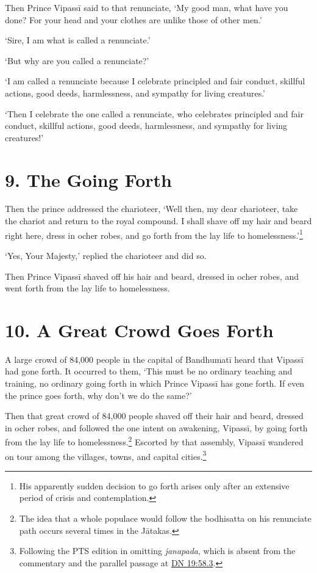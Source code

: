 \documentclass[12pt,openany]{book}%
\begin{document}
Then Prince \textsanskrit{Vipassī} said to that renunciate, ‘My good man, what have you done? For your head and your clothes are unlike those of other men.’ 

‘Sire, I am what is called a renunciate.’ 

‘But why are you called a renunciate?’ 

‘I am called a renunciate because I celebrate principled and fair conduct, skillful actions, good deeds, harmlessness, and sympathy for living creatures.’ 

‘Then I celebrate the one called a renunciate, who celebrates principled and fair conduct, skillful actions, good deeds, harmlessness, and sympathy for living creatures!’ 

\section*{9. The Going Forth }

Then the prince addressed the charioteer, ‘Well then, my dear charioteer, take the chariot and return to the royal compound. I shall shave off my hair and beard right here, dress in ocher robes, and go forth from the lay life to homelessness.’\footnote{His apparently sudden decision to go forth arises only after an extensive period of crisis and contemplation. } 

‘Yes, Your Majesty,’ replied the charioteer and did so. 

Then Prince \textsanskrit{Vipassī} shaved off his hair and beard, dressed in ocher robes, and went forth from the lay life to homelessness. 

\section*{10. A Great Crowd Goes Forth }

A large crowd of 84,000 people in the capital of \textsanskrit{Bandhumatī} heard that \textsanskrit{Vipassī} had gone forth. It occurred to them, ‘This must be no ordinary teaching and training, no ordinary going forth in which Prince \textsanskrit{Vipassī} has gone forth. If even the prince goes forth, why don’t we do the same?’ 

Then that great crowd of 84,000 people shaved off their hair and beard, dressed in ocher robes, and followed the one intent on awakening, \textsanskrit{Vipassī}, by going forth from the lay life to homelessness.\footnote{The idea that a whole populace would follow the bodhisatta on his renunciate path occurs several times in the \textsanskrit{Jātakas}. } Escorted by that assembly, \textsanskrit{Vipassī} wandered on tour among the villages, towns, and capital cities.\footnote{Following the PTS edition in omitting \textit{janapada}, which is absent from the commentary and the parallel passage at \href{https://suttacentral.net/dn19/en/sujato\#58.3}{DN 19:58.3}. } 
\end{document}
